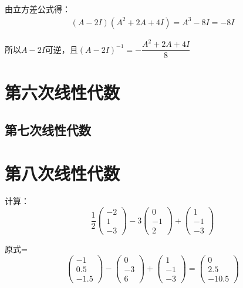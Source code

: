 \documentclass[a4paper]{report}
\begin{document}
\begin{zhengming}
由立方差公式得：
\begin{align*}
(A-2I)(A^2+2A+4I)=A^3-8I=-8I
\end{align*}

所以$A-2I$可逆，且$(A-2I)^{-1}=-\dfrac{A^2+2A+4I}{8}$
\end{zhengming}

\chapter{第六次线性代数}

\clearpage
\section{第七次线性代数}

\chapter{第八次线性代数}
\EX 计算：
\begin{equation*}
\frac{1}{2}
\begin{pmatrix}
-2\\ 1\\ -3
\end{pmatrix}-3
\begin{pmatrix}
0\\ -1\\ 2
\end{pmatrix}+
\begin{pmatrix}
1\\ -1\\ -3
\end{pmatrix}
\end{equation*}

\begin{jie}
原式=
\begin{equation*}
\begin{pmatrix}
-1\\ 0.5\\ -1.5
\end{pmatrix}-
\begin{pmatrix}
0\\ -3\\ 6
\end{pmatrix}+
\begin{pmatrix}
1\\ -1\\ -3
\end{pmatrix}=\begin{pmatrix}
0\\ 2.5\\ -10.5
\end{pmatrix}
\end{equation*}
\end{jie}
\end{document}
